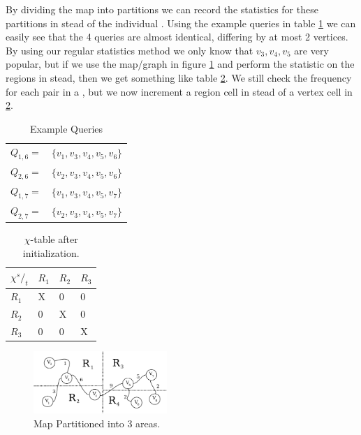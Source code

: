 By dividing the map into partitions we can record the statistics for these partitions in stead of the individual \spathsns. Using the example queries in table \ref{tab:queries2} we can easily see that the 4 queries are almost identical, differing by at most 2 vertices. By using our regular statistics method we only know that $v_3,v_4,v_5$ are very popular, but if we use the map/graph in figure \ref{fig:fillcache} and perform the statistic on the regions in stead, then we get something like table \ref{tab:rchitable}. We still check the frequency for each pair in a \spathns, but we now increment a region cell in stead of a vertex cell in \ref{tab:rchitable}. 


\begin{table}
\center
\begin{tabular}{l l}
$Q_{1,6} =$ 	& $\{v_1,v_3,v_4,v_5,v_6\}$\\
$Q_{2,6} =$ 	& $\{v_2,v_3,v_4,v_5,v_6\}$ \\
$Q_{1,7} =$ 	& $\{v_1,v_3,v_4,v_5,v_7\}$ \\
$Q_{2,7} =$ 	& $\{v_2,v_3,v_4,v_5,v_7\}$ \\
\end{tabular}
\caption{Example Queries}
\label{tab:queries2}
\end{table}

\begin{table}
\center
\begin{tabular}{|l||l|l|l|}
\textbf{$\chi {^s/_t}$}	& $R_1$		& $R_2$		& $R_3$	\\\hline
$R_1$			& X		& 0		& 0	 \\
$R_2$			& 0		& X		& 0	 \\
$R_3$			& 0		& 0		& X	 \\
\end{tabular}
\caption{$\chi$-table after initialization.}
\label{tab:rchitable}
\end{table}

\begin{figure}[bht]
  \center
        \includegraphics[width=0.45\textwidth]{figures/mappartition}
        \caption{Map Partitioned into 3 areas.}
  \label{fig:fillcache}
\end{figure}

